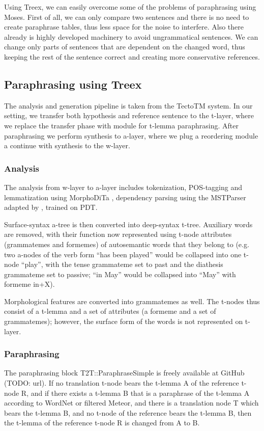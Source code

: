 \documentclass[11pt]{article}
\begin{document}
Using Treex, we can easily overcome some of the problems of paraphrasing using 
Moses. First of all, we can only compare two sentences and there is no need to 
create paraphrase tables, thus less space for the noise to interfere. Also 
there already is highly developed machinery to avoid ungrammatical sentences. 
We can change only parts of sentences that are dependent on the changed word, 
thus keeping the rest of the sentence correct and creating more conservative 
references.
%
\subsection{Paraphrasing using Treex}
The analysis and generation pipeline is taken from the TectoTM system. In our 
setting, we transfer both hypothesis and reference sentence to the t-layer, 
where we replace the transfer phase with module for t-lemma paraphrasing. 
After paraphrasing we perform synthesis to a-layer, where we plug a reordering 
module a continue with synthesis to the w-layer. 

\subsubsection{Analysis}
The analysis from w-layer to a-layer includes tokenization, POS-tagging and 
lemmatization using MorphoDiTa \cite{morphodita}, dependency parsing using the 
MSTParser \cite{McDonald:2005} adapted by , trained on PDT.

Surface-syntax a-tree is then converted into deep-syntax t-tree. Auxiliary 
words are removed, with their function now represented using t-node attributes 
(grammatemes and formemes) of autosemantic words that they belong to (e.g. two
a-nodes of the verb form “has been played” would be collapsed into one t-node
“play”, with the tense grammateme set to past and the diathesis grammateme
set to passive; “in May” would be collapsed into “May” with formeme in+X).

Morphological features are converted into grammatemes as well. The t-nodes
thus consist of a t-lemma and a set of attributes (a formeme and a set of 
grammatemes); however, the surface form of the words is not represented on 
t-layer.

\subsubsection{Paraphrasing}
The paraphrasing block T2T::ParaphraseSimple is freely available at GitHub (TODO: url). 
If no translation t-node bears the t-lemma A of the reference t-node R, and
if there exists a t-lemma B that is a paraphrase of the t-lemma A according
to WordNet or filtered Meteor, and there is a translation node T which bears 
the t-lemma B, and no t-node of the reference bears the t-lemma B, then the 
t-lemma of the reference t-node R is changed from A to B.
\end{document}
